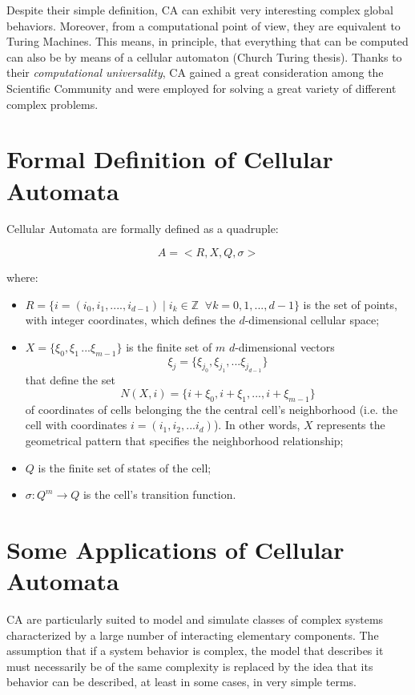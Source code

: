 Despite their simple definition, CA can exhibit very interesting
complex global behaviors. Moreover, from a computational point of
view, they are equivalent to Turing Machines. This means, in
principle, that everything that can be computed can also be by means
of a cellular automaton (Church Turing thesis). Thanks to their
\emph{computational universality}, CA gained a great consideration
among the Scientific Community and were employed for solving a great
variety of different complex problems.

\section{Formal Definition of Cellular Automata}

Cellular Automata are formally defined as a quadruple:

$$A = <R,X,Q,\sigma>$$

\noindent where:

\begin{itemize}
\item $R = \{i = (i_0,i_1,....,i_{d-1}) \; | \; i_k \in \mathbb{Z} \;\; \forall k =
  0,1,...,d-1\}$ is the set of points, with integer coordinates, which
  defines the $d$-dimensional cellular space;

\item $X = \{\xi_0,\xi_1\,...\xi_{m-1}\}$ is the finite set of $m$
  $d$-dimensional vectors
  \[ \xi_j = \{\xi_{j_0},\xi_{j_1},...\xi_{j_{d-1}}\} \]
  that define the set
  \[ N(X,i) = \{i + \xi_0,i + \xi_1,...,i + \xi_{m-1}\} \]
  of coordinates of cells belonging the the central cell's
  neighborhood (i.e. the cell with coordinates $i =
  (i_1,i_2,...i_d)$). In other words, $X$ represents the geometrical
  pattern that specifies the neighborhood relationship;

\item $Q$ is the finite set of states of the cell;

\item $\sigma : Q^m \rightarrow Q$ is the cell's transition function.

\end{itemize}


\section{Some Applications of Cellular Automata}

CA are particularly suited to model and simulate classes of
complex systems characterized by a large number of interacting
elementary components.  The assumption that if a system behavior is
complex, the model that describes it must necessarily be of the same
complexity is replaced by the idea that its behavior can be
described, at least in some cases, in very simple terms.

